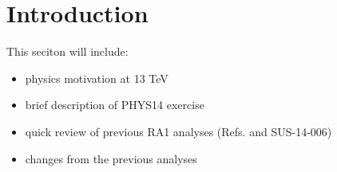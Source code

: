 \section{Introduction}
\label{sec:intro}


This seciton will include:

\begin{itemize}
  \item physics motivation at 13 TeV
  \item brief description of PHYS14 exercise
  \item quick review of previous RA1 analyses (Refs. \cite{Chatrchyan:2013lya,
	Chatrchyan:2012wa, Chatrchyan:2011zy, Khachatryan:2011tk} and
	SUS-14-006)
  \item changes from the previous analyses
\end{itemize}


